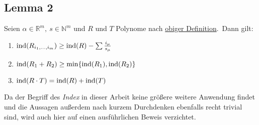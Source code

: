     \subsection{Lemma 2}
        \label{subsec:lemma2}
        Seien $\alpha \in \mathbb{R}^m,\ s \in \mathbb{N}^m$ und $R$ und $T$ Polynome nach \hyperref
        [subsubsec:def-poly]{obiger Definition}.\ Dann gilt:
        \begin{enumerate}
            \item $\operatorname{ind}(R_{i_1, \dots, i_m}) \geq \operatorname{ind}(R) - \sum \frac{i_\mu}{s_\mu}$
            \item $\operatorname{ind}(R_1 + R_2) \geq \min \{ \operatorname{ind}(R_1), \operatorname{ind}(R_2) \}$
            \item $\operatorname{ind}(R \cdot T) = \operatorname{ind}(R) +\operatorname{ind}(T)$
        \end{enumerate}
        \textrm{Da der Begriff des \emph{Index} in dieser Arbeit keine größere weitere Anwendung findet und die Aussagen
        außerdem nach kurzem Durchdenken ebenfalls recht trivial sind, wird auch hier auf einen ausführlichen Beweis
        verzichtet.}

    
